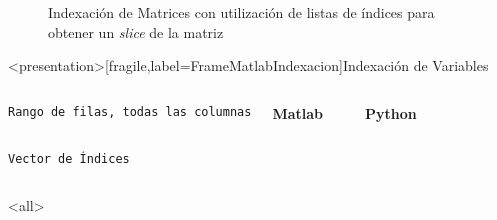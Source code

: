 \begin{figure}
  \caption{
    \protect\label{FigMatlabIndexacion}
  Indexación de Matrices con utilización de listas de índices para obtener un \protect\emph{slice}
  de la matriz
}
\end{figure}

\mode*

\begin{frame}<presentation>[fragile,label=FrameMatlabIndexacion]{Indexación de Variables}

\begin{columns}[T]
  \vspace{0.5cm}
\flushright \texttt{Rango de filas, todas las columnas}

  \textbf{Matlab}

\begin{codeblock}
  
\end{codeblock}
  \textbf{Python}
\begin{codeblock}
%  
  
\end{codeblock}

\end{columns}
  \vspace{0.5cm}
\begin{columns}[T]
\hfill \texttt{Vector de Índices}

\begin{codeblock}
  
\end{codeblock}

  \begin{codeblock}
    
  \end{codeblock}
\end{columns}
\end{frame}

\mode<all>
